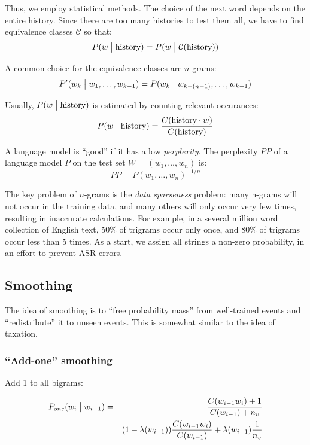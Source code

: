 \documentclass[11pt]{article}
\begin{document}
Thus, we employ statistical methods. The choice of the next word depends on the entire history. Since there are too many histories to test them all, we have to find equivalence classes $\mathcal{C}$ so that:
\[
    P(w \bigm| \mbox{history}) = P(w \bigm| \mathcal{C}(\mbox{history}))
\]

A common choice for the equivalence classes are $n$-grams:
\[
    P'(w_k \bigm| w_1, \ldots, w_{k-1}) = P(w_k \bigm| w_{k - (n - 1)}, \ldots, w_{k-1})
\]

Usually, $P(w \bigm| \mbox{history})$ is estimated by counting relevant occurances:
\[
    P(w \bigm| \mbox{history}) = \frac{C(\mbox{history} \cdot w)}{C(\mbox{history})}
\]

A language model is ``good'' if it has a low \textit{perplexity}. The perplexity $PP$ of a language model $P$ on the test set $W = (w_1, \ldots, w_n)$ is:
\[
    PP = P(w_1, \ldots, w_n)^{-1/n}
\]

The key problem of $n$-grams is the \textit{data sparseness} problem: many n-grams will not occur in the training data, and many others will only occur very few times, resulting in inaccurate calculations. For example, in a several million word collection of English text, 50\% of trigrams occur only once, and 80\% of trigrams occur less than 5 times. As a start, we assign all strings a non-zero probability, in an effort to prevent ASR errors.

\subsection{Smoothing}

The idea of smoothing is to ``free probability mass'' from well-trained events and ``redistribute'' it to unseen events. This is somewhat similar to the idea of taxation.

\subsubsection{``Add-one'' smoothing}

Add 1 to all bigrams:

\begin{eqnarray*}
    P_{one}(w_i \bigm| w_{i - 1}) &=& \frac{C(w_{i-1}w_i)+1}{C(w_{i-1}) + n_v} \\
                                  &=& (1 - \lambda(w_{i-1})) \frac{C(w_{i-1}w_i)}{C(w_{i-1})} + \lambda(w_{i-1}) \frac{1}{n_v}
\end{eqnarray*}
\end{document}
